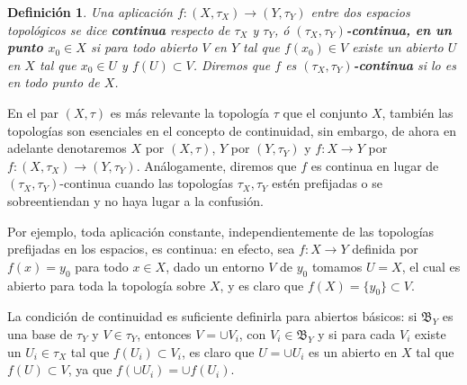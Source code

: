 \documentclass[12pt]{article}
\newtheorem{definition}[theorem]{Definición}
\begin{document}
\begin{definition}Una aplicación $f \colon (X, \tau_X) \longrightarrow (Y, \tau_Y)$ entre dos espacios topológicos se dice \textbf{continua} respecto de $\tau_X$ y $\tau_Y$, ó \textbf{$(\tau_X, \tau_Y)$-continua, en un punto $x_0 \in X$} si para todo abierto $V$ en $Y$ tal que $f(x_0) \in V$ existe un abierto $U$ en $X$ tal que $x_0 \in U$ y $f(U) \subset V$. Diremos que $f$ es \textbf{$(\tau_X, \tau_Y)$-continua} si lo es en todo punto de $X$.
\end{definition}
\begin{center}
\end{center}

En el par $(X, \tau)$ es más relevante la topología $\tau$ que el conjunto $X$, también las topologías son esenciales en el concepto de continuidad, sin embargo, de ahora en adelante denotaremos $X$ por $(X, \tau)$, $Y$ por $(Y, \tau_Y)$ y $f \colon X \longrightarrow Y$ por $f \colon (X, \tau_X) \longrightarrow (Y, \tau_Y)$. Análogamente, diremos que $f$ es continua en lugar de $(\tau_X, \tau_Y)$-continua cuando las topologías $\tau_X, \tau_Y$ estén prefijadas o se sobreentiendan y no haya lugar a la confusión.

Por ejemplo, toda aplicación constante, independientemente de las topologías prefijadas en los espacios, es continua: en efecto, sea $f \colon X \longrightarrow Y$ definida por $f(x) = y_0$ para todo $x \in X$, dado un entorno $V$ de $y_0$ tomamos $U = X$, el cual es abierto para toda la topología sobre $X$, y es claro que $f(X) = \lbrace y_0 \rbrace \subset V$.

La condición de continuidad es suficiente definirla para abiertos básicos: si $\mathfrak{B}_Y$ es una base de $\tau_Y$ y $V \in \tau_Y$, entonces $V = \cup V_i$, con $V_i \in \mathfrak{B}_Y$ y si para cada $V_i$ existe un $U_i \in \tau_X$ tal que $f(U_i) \subset V_i$, es claro que $U = \cup U_i$ es un abierto en $X$ tal que $f(U) \subset V$, ya que $f(\cup U_i) = \cup f(U_i)$.
\end{document}
